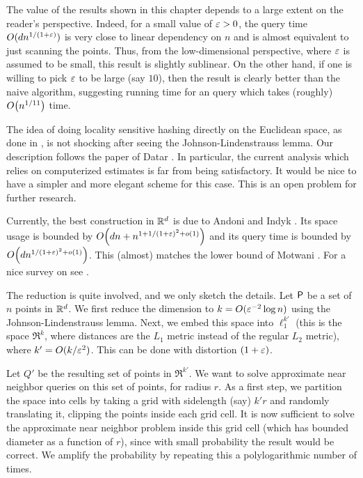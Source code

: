 The value of the results shown in this chapter depends to a large
extent on the reader's perspective. Indeed, for a small value of ${\varepsilon}
> 0$, the query time $O( d n^{1/(1+{\varepsilon})})$ is very close to
linear dependency on $n$ and is almost equivalent to just scanning the
points. Thus, from the low-dimensional perspective, where ${\varepsilon}$ is
assumed to be small, this result is slightly sublinear. On the other
hand, if one is willing to pick ${\varepsilon}$ to be large (say $10$), then
the result is clearly better than the naive algorithm, suggesting
running time for an \ANNbr query which takes (roughly) $O\pth{
   n^{1/11} }$ time.

The idea of doing locality sensitive hashing directly on the Euclidean
space, as done in , is not shocking after seeing
the Johnson-Lindenstrauss lemma. Our description follows the paper of
Datar \etal{} \cite{diim-lshsb-04}. In particular, the current
analysis which relies on computerized estimates is far from being
satisfactory. It would be nice to have a simpler and more elegant
scheme for this case. This is an open problem for further research.

Currently, the best \LSH construction in $\mathbb{R}^d$ is due to Andoni
and Indyk \cite{ai-nohaa-06}. Its space usage is bounded by $O
\pth{\hdim n + n^{1 + 1/(1+\eps)^2 + o(1)}}$ and its query time is
bounded by $O\pth{ \hdim n^{1/(1+\eps)^2 +o(1)}}$. This (almost)
matches the lower bound of Motwani \etal \cite{mnp-lblsh-06}. For a
nice survey on \LSH see \cite{ai-nohaa-08}.




The reduction is quite involved, and we only sketch the details. Let
${\mathsf{P}}$ be a set of $n$ points in $\mathbb{R}^d$. We first reduce the
dimension to $k = O({\varepsilon}^{-2} \log n)$ using the Johnson-Lindenstrauss
lemma. Next, we embed this space into $\ell^{k'}_1$ (this is the space
$\Re^k$, where distances are the $L_1$ metric instead of the regular
$L_2$ metric), where $k'=O(k/{\varepsilon}^2)$. This can be done with
distortion $(1+{\varepsilon})$.

Let $Q'$ be the resulting set of points in $\Re^{k'}$. We want to
solve approximate near neighbor queries on this set of points, for
radius $r$. As a first step, we partition the space into cells by
taking a grid with sidelength (say) $k'r$ and randomly translating it,
clipping the points inside each grid cell. It is now sufficient to
solve the approximate near neighbor problem inside this grid cell
(which has bounded diameter as a function of $r$), since with small
probability the result would be correct. We amplify the probability by
repeating this a polylogarithmic number of times.
   
